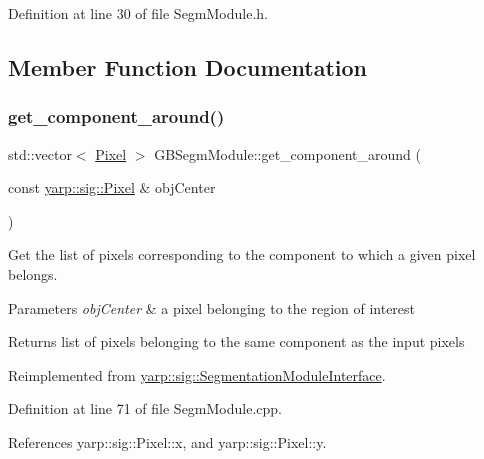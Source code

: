 Definition at line 30 of file Segm\+Module.\+h.



\subsection{Member Function Documentation}
\mbox{\label{classGBSegmModule_a0b63c53513e67c4f126e29cf7f28ad53}} 
\subsubsection{\texorpdfstring{get\+\_\+component\+\_\+around()}{get\_component\_around()}}
{\footnotesize\ttfamily std\+::vector$<$ \hyperlink{classyarp_1_1sig_1_1Pixel}{Pixel} $>$ G\+B\+Segm\+Module\+::get\+\_\+component\+\_\+around (\begin{DoxyParamCaption}\item[{const \hyperlink{classyarp_1_1sig_1_1Pixel}{yarp\+::sig\+::\+Pixel} \&}]{obj\+Center }\end{DoxyParamCaption})\hspace{0.3cm}{\ttfamily [virtual]}}



Get the list of pixels corresponding to the component to which a given pixel belongs. 


\begin{DoxyParams}{Parameters}
{\em obj\+Center} & a pixel belonging to the region of interest \\
\hline
\end{DoxyParams}
\begin{DoxyReturn}{Returns}
list of pixels belonging to the same component as the input pixels 
\end{DoxyReturn}


Reimplemented from \hyperlink{classyarp_1_1sig_1_1SegmentationModuleInterface_a9bf0b95fbab216b2284122b0b8a36820}{yarp\+::sig\+::\+Segmentation\+Module\+Interface}.



Definition at line 71 of file Segm\+Module.\+cpp.



References yarp\+::sig\+::\+Pixel\+::x, and yarp\+::sig\+::\+Pixel\+::y.



